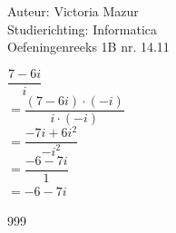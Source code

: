\documentclass[a4paper]{article}
\begin{document}
  
\noindent \large Auteur: Victoria Mazur \\
\noindent \large Studierichting: Informatica\\
\noindent \large Oefeningenreeks 1B nr. 14.11\\

\medskip

\normalsize

$\dfrac{7-6i}{i}$ \\

$= \dfrac{\left(7 - 6i \right) \cdot \left(-i \right)}{i \cdot \left(-i \right)}$ \\

$= \dfrac{-7i + 6i^2}{-i^2}$ \\

$= \dfrac{-6 -7i}{1}$ \\

$= -6 -7i $
 
\begin{thebibliography}{999}
\end{thebibliography}
\end{document}
